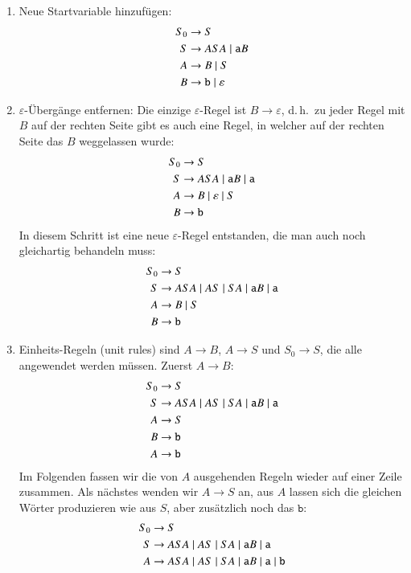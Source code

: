 \begin{enumerate}
\item Neue Startvariable hinzufügen:
\begin{align*}
S_0&\to S\\
S&\to ASA\;|\; {\tt a}B\\
A&\to B\;|\; S\\
B&\to{\tt b}\;|\; \varepsilon
\end{align*}
\item $\varepsilon$-Übergänge entfernen: Die einzige $\varepsilon$-Regel
ist $B\to\varepsilon$, d.\,h.~zu jeder Regel mit $B$ auf der rechten
Seite gibt es auch eine Regel, in welcher auf der rechten Seite das $B$
weggelassen wurde:
\begin{align*}
S_0&\to S\\
S&\to ASA\;|\; {\tt a}B\;|\;{\tt a}\\
A&\to B \;|\; \varepsilon \;|\; S\\
B&\to{\tt b}
\end{align*}
In diesem Schritt ist eine neue $\varepsilon$-Regel entstanden, die
man auch noch gleichartig behandeln muss:
\begin{align*}
S_0&\to S\\
S&\to ASA \;|\; AS \;|\; SA \;|\; {\tt a}B\;|\;{\tt a}\\
A&\to B \;|\; S\\
B&\to{\tt b}
\end{align*}
\item Einheits-Regeln (unit rules) sind $A\to B$, $A\to S$ und $S_0\to S$,
die alle angewendet werden müssen.
Zuerst $A\to B$:
\begin{align*}
S_0&\to S\\
S&\to ASA \;|\; AS \;|\; SA \;|\; {\tt a}B\;|\;{\tt a}\\
A&\to S\\
B&\to{\tt b}\\
A&\to{\tt b}
\end{align*}
Im Folgenden fassen wir die von $A$ ausgehenden Regeln wieder auf
einer Zeile zusammen.
Als nächstes wenden wir $A\to S$ an, aus $A$ lassen sich die gleichen
Wörter produzieren wie aus $S$, aber zusätzlich noch das $\texttt{b}$:
\begin{align*}
S_0&\to S\\
S&\to ASA \;|\; AS \;|\; SA \;|\; {\tt a}B\;|\;{\tt a}\\
A&\to ASA \;|\; AS \;|\; SA \;|\; {\tt a}B\;|\;{\tt a}\;|\;{\tt b}\\

\end{align*}
\end{enumerate}
